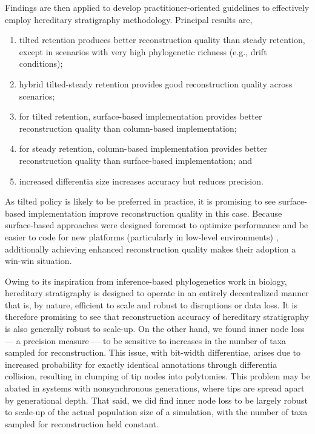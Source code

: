 Findings are then applied to develop practitioner-oriented guidelines to effectively employ hereditary stratigraphy methodology.
Principal results are,
\begin{enumerate}
\item tilted retention produces better reconstruction quality than steady retention, except in scenarios with very high phylogenetic richness (e.g., drift conditions);
\item hybrid tilted-steady retention provides good reconstruction quality across scenarios;
\item for tilted retention, surface-based implementation provides better reconstruction quality than column-based implementation;
\item for steady retention, column-based implementation provides better reconstruction quality than surface-based implementation; and
\item increased differentia size increases accuracy but reduces precision.
\end{enumerate}
As tilted policy is likely to be preferred in practice, it is promising to see surface-based implementation improve reconstruction quality in this case.
Because surface-based approaches were designed foremost to optimize performance and be easier to code for new platforms (particularly in low-level environments) \citep{moreno2024trackable}, additionally achieving enhanced reconstruction quality makes their adoption a win-win situation.

Owing to its inspiration from inference-based phylogenetics work in biology, hereditary stratigraphy is designed to operate in an entirely decentralized manner that is, by nature, efficient to scale and robust to disruptions or data loss.
It is therefore promising to see that reconstruction accuracy of hereditary stratigraphy is also generally robust to scale-up.
On the other hand, we found inner node loss --- a precision measure --- to be sensitive to increases in the number of taxa sampled for reconstruction.
This issue, with bit-width differentiae, arises due to increased probability for exactly identical annotations through differentia collision, resulting in clumping of tip nodes into polytomies.
This problem may be abated in systems with nonsynchronous generations, where tips are spread apart by generational depth.
That said, we did find inner node loss to be largely robust to scale-up of the actual population size of a simulation, with the number of taxa sampled for reconstruction held constant.

